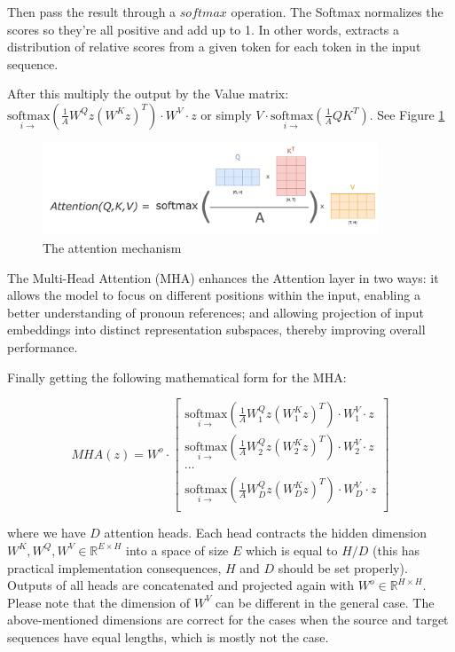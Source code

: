 \noindent Then pass the result through a $softmax$ operation. The Softmax normalizes the scores so they’re all positive and add up to 1. In other words, extracts a distribution of relative scores from a given token for each token in the input sequence.

\noindent After this multiply the output by the Value matrix: $\underset{i \rightarrow}{\mathrm{softmax}}\left( \frac{1}{A} W^Q z \left(W^K z\right)^T \right) \cdot W^V \cdot z $ or simply $V \cdot \underset{i \rightarrow}{\mathrm{softmax}}\left( \frac{1}{A} Q K^T \right)$. See Figure \ref{fig:att_ops}

\begin{figure}[h]
    \centering
    \includegraphics[width=10cm]{pages/imgs/att_ops.png}
    \caption{The attention mechanism}
    \label{fig:att_ops}
\end{figure}


The Multi-Head Attention ($\mathrm{MHA}$) enhances the Attention layer in two ways: it allows the model to focus on different positions within the input, enabling a better understanding of pronoun references; and allowing projection of input embeddings into distinct representation subspaces, thereby improving overall performance.

\noindent Finally getting the following mathematical form for the $\mathrm{MHA}$:


\begin{equation}
MHA(z) =  W^o \cdot
\begin{bmatrix}
    \underset{i \rightarrow}{\mathrm{softmax}}\left( \frac{1}{A} W^Q_1 z \left(W^K_1 z\right)^T \right) \cdot W^V_1 \cdot z \\
    \underset{i \rightarrow}{\mathrm{softmax}}\left( \frac{1}{A} W^Q_2 z \left(W^K_2 z\right)^T \right) \cdot W^V_2 \cdot z \\
    \cdots\\
    \underset{i \rightarrow}{\mathrm{softmax}}\left( \frac{1}{A} W^Q_D z \left(W^K_D z\right)^T \right) \cdot W^V_D \cdot z \\
\end{bmatrix}\nonumber
\end{equation}

where we have $D$ attention heads. Each head contracts the hidden dimension $W^K, W^Q, W^V \in \mathbb{R}^{E \times H}$ into a space of size $E$ which is equal to $H / D$ (this has practical implementation consequences, $H$ and $D$ should be set properly). Outputs of all heads are concatenated and projected again with $W^o \in \mathbb{R}^{H \times H}$.
Please note that the dimension of $W^V$ can be different in the general case. The above-mentioned dimensions are correct for the cases when the source and target sequences have equal lengths, which is mostly not the case.


